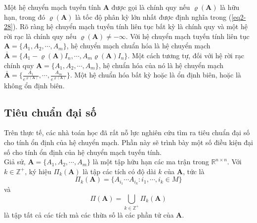 \documentclass[14pt,a4paper,oneside]{report}		%
\theoremstyle{definition}
\begin{document}
Một hệ chuyển mạch tuyến tính $\mathbf{A}$ được gọi là chính quy nếu $\varrho(\mathbf{A})$ là hữu hạn, trong đó $\varrho(\mathbf{A})$ là tốc độ phân kỳ lớn nhất được định nghĩa trong (\ref{eq2-28}). Rõ ràng hệ chuyển mạch tuyến tính liên tục bất kỳ là chính quy và một hệ rời rạc là chính quy nếu $\varrho(\mathbf{A})\neq -\infty$. Với hệ chuyển mạch tuyến tính liên tục $\mathbf{A}=\{A_1,A_2,\cdots,A_m\}$, hệ chuyển mạch chuẩn hóa là hệ chuyển mạch $\bar{\mathbf{A}}=\{A_1-\varrho(\mathbf{A})I_n,\cdots,A_m\varrho(\mathbf{A})I_n\}$. Một cách tương tự, đối với hệ rời rạc chính quy $\mathbf{A}=\{A_1,A_2,\cdots,A_m\}$, hệ chuẩn hóa của nó là hệ chuyển mạch $\bar{\mathbf{A}}=\{\frac{A_1}{e^{\varrho(\mathbf{A})}},\cdots,\frac{A_m}{e^{\varrho(\mathbf{A})}}\}$. Một hệ chuẩn hóa bất kỳ hoặc là ổn định biên, hoặc là không ổn định biên.
\subsection{Tiêu chuẩn đại số}
Trên thực tế, các nhà toán học đã rất nỗ lực nghiên cứu tìm ra tiêu chuẩn đại số cho tính ổn định của hệ chuyển mạch. Phần này sẽ trình bày một số điều kiện đại số cho tính ổn định của hệ chuyển mạch tuyến tính.\\

Giả sử, $\mathbf{A}=\{A_1,A_2,\cdots,A_m\}$ là một tập hữu hạn các ma trận trong $\mathbb{R}^{n\times n}$. Với $k\in\mathbb{Z}^+$, ký hiệu $\Pi_k(\mathbf{A})$ là tập các tích có độ dài $k$ của $\mathbf{A}$, tức là
$$\Pi_k(\mathbf{A})=\{A_{i_1}\cdots A_{i_k} : i_1,\cdots ,i_k\in M\}$$
và
$$\Pi(\mathbf{A})=\bigcup_{k\in\mathbb{Z}^+}\Pi_k(\mathbf{A})$$
là tập tất cả các tích mà các thừa số là các phần tử của $\mathbf{A}$.\\
\end{document}
